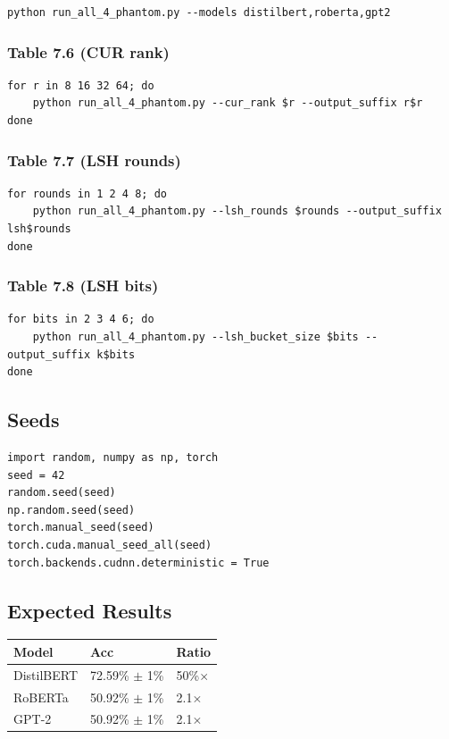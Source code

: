 \begin{lstlisting}
python run_all_4_phantom.py --models distilbert,roberta,gpt2
\end{lstlisting}

\subsubsection{Table 7.6 (CUR rank)}

\begin{lstlisting}
for r in 8 16 32 64; do
    python run_all_4_phantom.py --cur_rank $r --output_suffix r$r
done
\end{lstlisting}

\subsubsection{Table 7.7 (LSH rounds)}

\begin{lstlisting}
for rounds in 1 2 4 8; do
    python run_all_4_phantom.py --lsh_rounds $rounds --output_suffix lsh$rounds
done
\end{lstlisting}

\subsubsection{Table 7.8 (LSH bits)}

\begin{lstlisting}
for bits in 2 3 4 6; do
    python run_all_4_phantom.py --lsh_bucket_size $bits --output_suffix k$bits
done
\end{lstlisting}

\subsection{Seeds}

\begin{lstlisting}
import random, numpy as np, torch
seed = 42
random.seed(seed)
np.random.seed(seed)
torch.manual_seed(seed)
torch.cuda.manual_seed_all(seed)
torch.backends.cudnn.deterministic = True
\end{lstlisting}

\subsection{Expected Results}

\begin{table}[H]
\centering
\small
\begin{tabular}{lll}
\toprule
\textbf{Model} & \textbf{Acc} & \textbf{Ratio} \\
\midrule
DistilBERT & 72.59\% $\pm$ 1\% & 50\%$\times$ \\
RoBERTa & 50.92\% $\pm$ 1\% & 2.1$\times$ \\
GPT-2 & 50.92\% $\pm$ 1\% & 2.1$\times$ \\
\bottomrule
\end{tabular}
\end{table}

